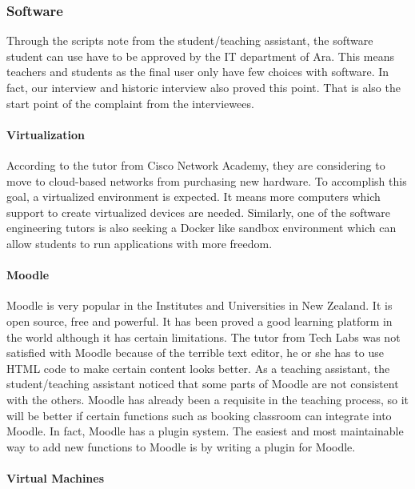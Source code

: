 \subsubsection{Software} 

Through the scripts note from the student/teaching assistant, the software student can use have to be approved by the IT department of Ara. This means teachers and students as the final user only have few choices with software. In fact, our interview and historic interview also proved this point. That is also the start point of the complaint from the interviewees. 

\paragraph{Virtualization}

According to the tutor from Cisco Network Academy, they are considering to move to cloud-based networks from purchasing new hardware. To accomplish this goal, a virtualized environment is expected. It means more computers which support to create virtualized devices are needed. Similarly, one of the software engineering tutors is also seeking a Docker like sandbox environment which can allow students to run applications with more freedom. 

\paragraph{Moodle}

Moodle is very popular in the Institutes and Universities in New Zealand. It is open source, free and powerful. It has been proved a good learning platform in the world although it has certain limitations. The tutor from Tech Labs was not satisfied with Moodle because of the terrible text editor, he or she has to use HTML code to make certain content looks better. As a teaching assistant, the student/teaching assistant noticed that some parts of Moodle 
are not consistent with the others. Moodle has already been a requisite in the teaching process, so it will be better if certain functions such as booking classroom can integrate into Moodle. In fact, Moodle has a plugin system. The easiest and most maintainable way to add new functions to Moodle is by writing a plugin for Moodle.

\paragraph{Virtual Machines}

